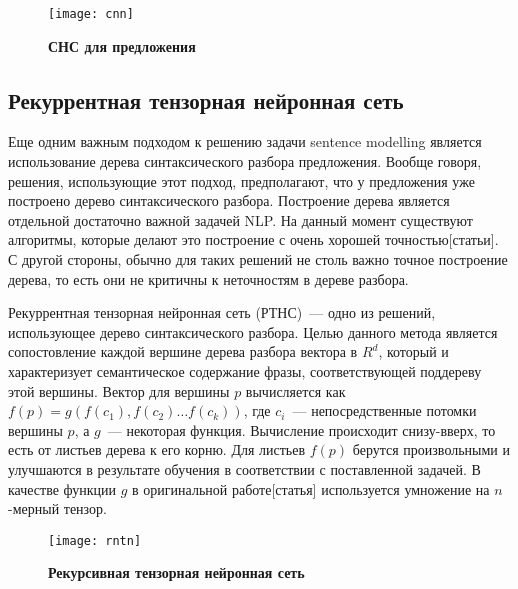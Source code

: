 \begin{figure}[h]
\texttt{[image: cnn]}
\caption{\textbf{СНС для предложения}}
\label{fig:cnn}
\end{figure}

\subsection{Рекуррентная тензорная нейронная сеть}
Еще одним важным подходом к решению задачи sentence modelling является использование 
дерева синтаксического разбора предложения. Вообще говоря, решения, использующие этот подход, предполагают, что у предложения уже построено дерево синтаксического разбора. Построение дерева является отдельной достаточно важной задачей NLP. На данный момент существуют алгоритмы, которые делают это построение с очень хорошей точностью[статьи]. 
С другой стороны, обычно для таких решений не столь важно точное построение дерева, то есть они не критичны к неточностям в дереве разбора.

Рекуррентная тензорная нейронная сеть (РТНС)~--- одно из решений, использующее дерево синтаксического разбора. Целью данного метода является сопостовление каждой вершине дерева разбора вектора в $R^d$, 
который и характеризует семантическое содержание фразы, соответствующей поддереву этой вершины.
Вектор для вершины $p$ вычисляется как $f(p)=g(f(c_1), f(c_2) \dots{} f(c_k))$, где $c_i$~--- непосредственные потомки вершины $p$, а $g$~--- некоторая функция. Вычисление происходит снизу-вверх, то
есть от листьев дерева к его корню. Для листьев $f(p)$ берутся произвольными и улучшаются в результате обучения в соответствии с поставленной задачей.
В качестве функции $g$ в оригинальной работе[статья] используется умножение на $n$-мерный тензор.

\begin{figure}[h]
\texttt{[image: rntn]}
\caption{\textbf{Рекурсивная тензорная нейронная сеть}}
\label{fig:rntn}
\end{figure}
 





